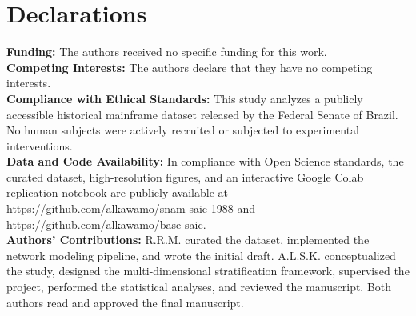 \documentclass[pdflatex,sn-basic]{sn-jnl}
\begin{document}
\section*{Declarations}
\noindent\textbf{Funding:} The authors received no specific funding for this work.\\[3pt]
\noindent\textbf{Competing Interests:} The authors declare that they have no competing interests.\\[3pt]
\noindent\textbf{Compliance with Ethical Standards:} This study analyzes a publicly accessible historical mainframe dataset released by the Federal Senate of Brazil. No human subjects were actively recruited or subjected to experimental interventions.\\[3pt]
\noindent\textbf{Data and Code Availability:} In compliance with Open Science standards, the curated dataset, high-resolution figures, and an interactive Google Colab replication notebook are publicly available at \url{https://github.com/alkawamo/snam-saic-1988} and \url{https://github.com/alkawamo/base-saic}.\\[3pt]
\noindent\textbf{Authors' Contributions:} R.R.M. curated the dataset, implemented the network modeling pipeline, and wrote the initial draft. A.L.S.K. conceptualized the study, designed the multi-dimensional stratification framework, supervised the project, performed the statistical analyses, and reviewed the manuscript. Both authors read and approved the final manuscript.


\end{document}
